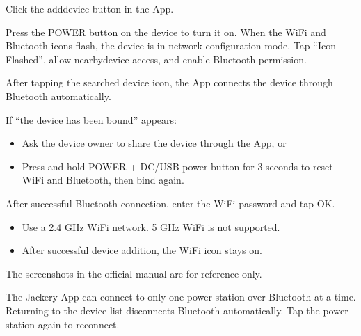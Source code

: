 \documentclass[a4paper,10pt,twoside,openany,english]{sphinxhowto}
\let\sphinxpxdimen\pdfpxdimen\else\newdimen\sphinxpxdimen
\begin{document}
\sphinxAtStartPar
{}

 Click the add\sphinxhyphen{}device button in the App.

 Press the POWER button on the device to turn it on.
When the Wi\sphinxhyphen{}Fi and Bluetooth icons flash, the device is in network configuration mode.
Tap “Icon Flashed”, allow nearby\sphinxhyphen{}device access, and enable Bluetooth permission.

\noindent\sphinxincludegraphics[width=320\sphinxpxdimen]{{fig}.png}

 After tapping the searched device icon, the App connects the device through Bluetooth automatically.

\sphinxAtStartPar
{}

\sphinxAtStartPar
If “the device has been bound” appears:
\begin{itemize}
\item {} 
\sphinxAtStartPar
Ask the device owner to share the device through the App, or

\item {} 
\sphinxAtStartPar
Press and hold POWER + DC/USB power button for 3 seconds to reset Wi\sphinxhyphen{}Fi and Bluetooth, then bind again.

\end{itemize}

 After successful Bluetooth connection, enter the Wi\sphinxhyphen{}Fi password and tap OK.

\sphinxAtStartPar
{}
\begin{itemize}
\item {} 
\sphinxAtStartPar
Use a 2.4 GHz Wi\sphinxhyphen{}Fi network. 5 GHz Wi\sphinxhyphen{}Fi is not supported.

\item {} 
\sphinxAtStartPar
After successful device addition, the Wi\sphinxhyphen{}Fi icon stays on.

\end{itemize}

\sphinxAtStartPar
The screenshots in the official manual are for reference only.

\sphinxAtStartPar
{}

\sphinxAtStartPar
The Jackery App can connect to only one power station over Bluetooth at a time.
Returning to the device list disconnects Bluetooth automatically.
Tap the power station again to reconnect.
\end{document}
